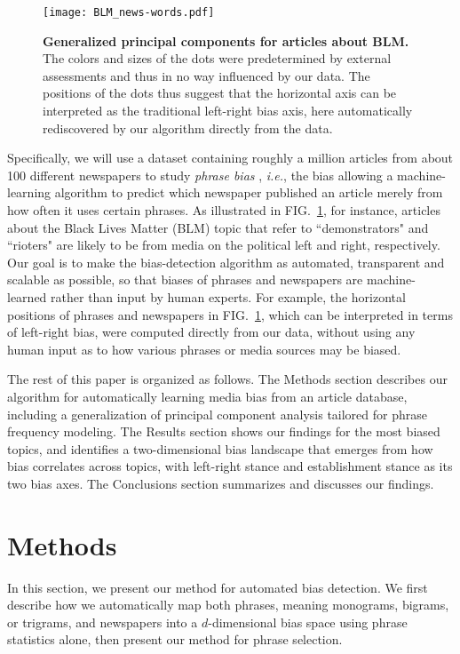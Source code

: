 \documentclass[10pt,letterpaper]{article}
\def\ie{{\frenchspacing\it i.e.}}
\def\fig#1{FIG.~\ref{#1}}
\begin{document}
\begin{figure}[t]
\caption{ 
{\bf Generalized principal components for articles about BLM.} The colors and sizes of the dots were predetermined by external assessments and thus in no way influenced by our data. The positions of the dots thus suggest that the horizontal axis can be interpreted as the traditional left-right bias axis, here automatically rediscovered by our algorithm
directly from the data.
}
\hglue-5.89cm\texttt{[image: BLM\_news-words.pdf]}
\label{BLMfig}
\end{figure}


Specifically, we will use a dataset containing roughly a million articles from about 100 different newspapers to study {\it phrase bias} \cite{hamborg_automated_2019}, \ie, the bias allowing a machine-learning algorithm to predict which newspaper published an article 
merely from how often it uses certain phrases.
As illustrated in \fig{BLMfig}, for instance, articles about the Black Lives Matter (BLM) topic 
that refer to ``demonstrators" and ``rioters" are likely to be from media on the political left and right, respectively. Our goal is to make the bias-detection algorithm as automated, transparent and scalable as possible, so that biases of phrases and newspapers are machine-learned rather than input by human experts.  For example, the horizontal positions of phrases and newspapers in \fig{BLMfig}, which can be interpreted in terms of left-right bias, were computed directly from our data, without using any human input as to how various phrases or media sources may be biased.

The rest of this paper is organized as follows. The Methods section describes our algorithm for automatically learning media bias from an article database, including a generalization of principal component analysis tailored for phrase frequency modeling. The Results section shows our findings for the most biased topics, and identifies a two-dimensional bias landscape that emerges from how bias correlates across topics, with left-right stance and establishment stance as its two bias axes.
The Conclusions section summarizes and discusses our findings.

\section*{Methods }

In this section, we present our method for automated bias detection.
We first describe how we automatically map both phrases, meaning monograms, bigrams, or trigrams, and newspapers into a $d$-dimensional bias space using phrase statistics alone, then present our method for phrase selection. 
\end{document}

